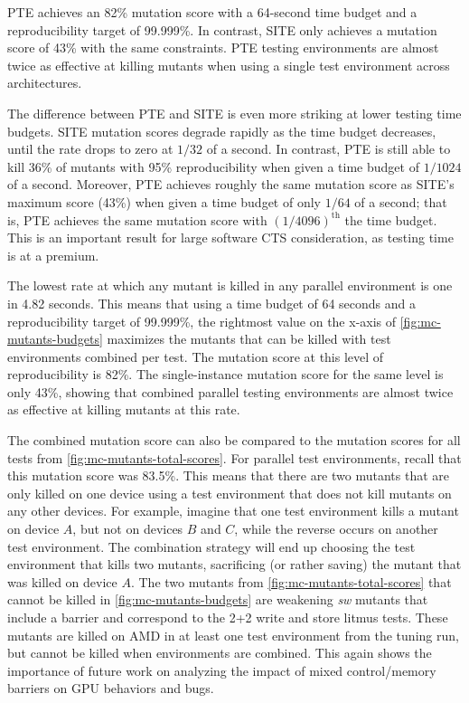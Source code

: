 PTE achieves an 82\% mutation score with a 64-second time budget and a reproducibility target of 99.999\%. In contrast, SITE only achieves a mutation score of 43\% with the same constraints. PTE testing environments are almost twice as effective at killing mutants when using a single test environment across architectures.

The difference between PTE and SITE is even more striking at lower testing time budgets.  SITE mutation scores degrade rapidly as the time budget decreases, until the rate drops to zero at $1/32$ of a second. In contrast, PTE is still able to kill 36\% of mutants with 95\% reproducibility when given a time budget of $1/1024$ of a second.  Moreover, PTE achieves roughly the same mutation score as SITE's maximum score (43\%) when given a time budget of only $1/64$ of a second; that is, PTE achieves the same mutation score with $(1/4096)^{\text{th}}$ the time budget. This is an important result for large software CTS consideration, as testing time is at a premium.

The lowest rate at which any mutant is killed in any parallel environment is one in 4.82 seconds. This means that using a time budget of 64 seconds and a reproducibility target of 99.999\%, the rightmost value on the x-axis of \myfig\ref{fig:mc-mutants-budgets} maximizes the mutants that can be killed with test environments combined per test. The mutation score at this level of reproducibility is 82\%. The single-instance mutation score for the same level is only 43\%, showing that combined parallel testing environments are almost twice as effective at killing mutants at this rate.

The combined mutation score can also be compared to the mutation scores for all tests from \myfig\ref{fig:mc-mutants-total-scores}. For parallel test environments, recall that this mutation score was 83.5\%. This means that there are two mutants that are only killed on one device using a test environment that does not kill mutants on any other devices. For example, imagine that one test environment kills a mutant on device $A$, but not on devices $B$ and $C$, while the reverse occurs on another test environment. The combination strategy will end up choosing the test environment that kills two mutants, sacrificing (or rather saving) the mutant that was killed on device $A$. The two mutants from \myfig\ref{fig:mc-mutants-total-scores} that cannot be killed in \myfig\ref{fig:mc-mutants-budgets} are weakening \textit{sw} mutants that include a barrier and correspond to the 2+2 write and store litmus tests. These mutants are killed on AMD in at least one test environment from the tuning run, but cannot be killed when environments are combined. This again shows the importance of future work on analyzing the impact of mixed control/memory barriers on GPU behaviors and bugs.

